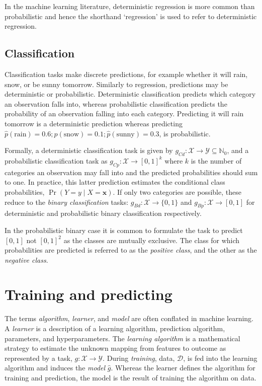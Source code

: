 \documentclass[
  letterpaper,
  krantz2]{style/krantz}
\begin{document}
In the machine learning literature, deterministic regression is more
common than probabilistic and hence the shorthand `regression' is used
to refer to deterministic regression.

\subsection{Classification}\label{sec-ml-tasks-classif}

Classification tasks make discrete predictions, for example whether it
will rain, snow, or be sunny tomorrow. Similarly
to regression, predictions may be deterministic or probabilistic.
Deterministic classification
predicts which category an observation falls into, whereas probabilistic
classification predicts the
probability of an observation falling into each category. Predicting it
will rain tomorrow is a deterministic prediction whereas predicting
\(\hat{p}(\text{rain}) = 0.6; \hat{p}(\text{snow}) = 0.1; \hat{p}(\text{sunny}) = 0.3\),
is probabilistic.

Formally, a deterministic classification task is given by
\(g_{Cd} : \mathcal{X}\rightarrow \mathcal{Y}\subseteq \mathbb{N}_0\),
and a probabilistic classification task as
\(g_{Cp} : \mathcal{X}\rightarrow [0,1]^k\) where \(k\) is the number of
categories an observation may fall into and the predicted probabilities
should sum to one. In practice, this latter prediction estimates the
conditional class probabilities, \(\Pr(Y = y \mid X = \mathbf{x})\). If
only two categories are possible, these reduce to the \emph{binary
classification} tasks: \(g_{Bd}: \mathcal{X}\rightarrow \{0, 1\}\) and
\(g_{Bp}: \mathcal{X}\rightarrow [0, 1]\) for deterministic and
probabilistic binary classification
respectively.

In the probabilistic binary case it is common to formulate the task to
predict \([0,1]\) not \([0,1]^2\) as the classes are mutually exclusive.
The class for which probabilities are predicted is referred to as the
\emph{positive class}, and the other as the \emph{negative
class}.

\section{Training and predicting}\label{sec-ml-models}

The terms \emph{algorithm}, \emph{learner}, and \emph{model} are often
conflated in machine
learning. A \emph{learner}
is a description of a learning algorithm, prediction algorithm,
parameters, and hyperparameters. The
\emph{learning algorithm} is a mathematical strategy to estimate the
unknown mapping from features to outcome as represented by a task,
\(g: \mathcal{X}\rightarrow \mathcal{Y}\). During \emph{training}, data,
\(\mathcal{D}\), is fed into the learning algorithm and induces the
\emph{model} \(\hat{g}\). Whereas the learner defines the algorithm for
training and prediction, the model is the result of training the
algorithm on data.
\end{document}
